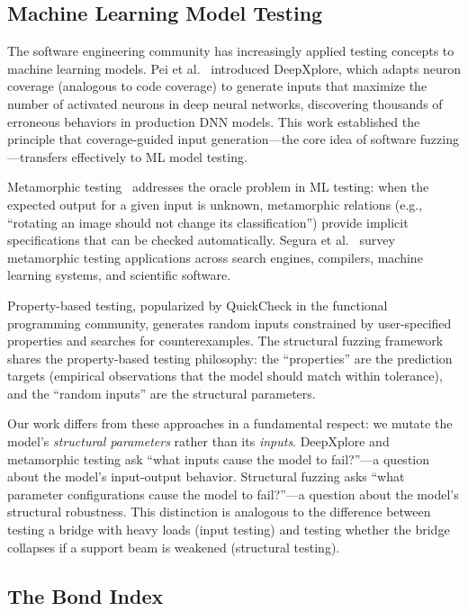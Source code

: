 \documentclass[manuscript,review,anonymous]{acmart}
\begin{document}
\subsection{Machine Learning Model Testing}

The software engineering community has increasingly applied testing concepts to machine learning models.
Pei et al.~\cite{pei2017} introduced DeepXplore, which adapts neuron coverage (analogous to code coverage) to generate inputs that maximize the number of activated neurons in deep neural networks, discovering thousands of erroneous behaviors in production DNN models.
This work established the principle that coverage-guided input generation---the core idea of software fuzzing---transfers effectively to ML model testing.

Metamorphic testing~\cite{segura2016} addresses the oracle problem in ML testing: when the expected output for a given input is unknown, metamorphic relations (e.g., ``rotating an image should not change its classification'') provide implicit specifications that can be checked automatically.
Segura et al.~\cite{segura2016} survey metamorphic testing applications across search engines, compilers, machine learning systems, and scientific software.

Property-based testing, popularized by QuickCheck in the functional programming community, generates random inputs constrained by user-specified properties and searches for counterexamples.
The structural fuzzing framework shares the property-based testing philosophy: the ``properties'' are the prediction targets (empirical observations that the model should match within tolerance), and the ``random inputs'' are the structural parameters.

Our work differs from these approaches in a fundamental respect: we mutate the model's \emph{structural parameters} rather than its \emph{inputs}.
DeepXplore and metamorphic testing ask ``what inputs cause the model to fail?''---a question about the model's input-output behavior.
Structural fuzzing asks ``what parameter configurations cause the model to fail?''---a question about the model's structural robustness.
This distinction is analogous to the difference between testing a bridge with heavy loads (input testing) and testing whether the bridge collapses if a support beam is weakened (structural testing).

\subsection{The Bond Index}
\end{document}
